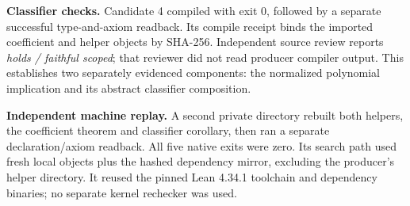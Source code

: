 \textbf{Classifier checks.} Candidate 4 compiled with exit 0, followed by a separate successful type-and-axiom readback. Its compile receipt binds the imported coefficient and helper objects by SHA-256. Independent source review reports \emph{holds / faithful scoped}; that reviewer did not read producer compiler output. This establishes two separately evidenced components: the normalized polynomial implication and its abstract classifier composition.

\textbf{Independent machine replay.} A second private directory rebuilt both helpers, the coefficient theorem and classifier corollary, then ran a separate declaration/axiom readback. All five native exits were zero. Its search path used fresh local objects plus the hashed dependency mirror, excluding the producer's helper directory. It reused the pinned Lean 4.34.1 toolchain and dependency binaries; no separate kernel rechecker was used.
